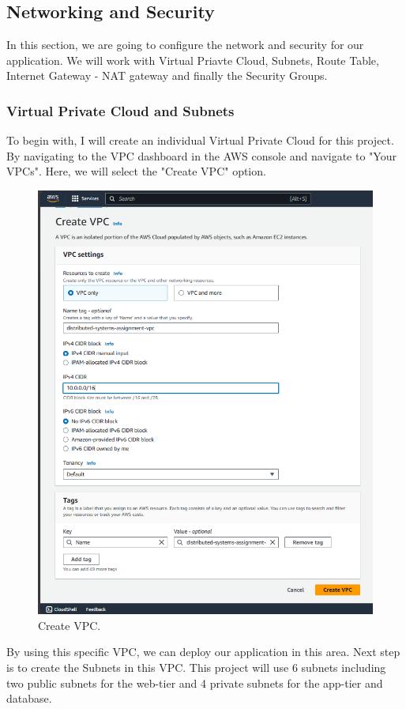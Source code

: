 \documentclass{article}
\begin{document}
\newpage
\subsection{Networking and Security}
In this section, we are going to configure the network and security for our application. We will work with Virtual Priavte Cloud, Subnets, Route Table, Internet Gateway - NAT gateway and finally the Security Groups.\par
\subsubsection{Virtual Private Cloud and Subnets}
To begin with, I will create an individual Virtual Private Cloud for this project. By navigating to the VPC dashboard in the AWS console and navigate to "Your VPCs". Here, we will select the "Create VPC" option.

\begin{figure}[h]
    \centering
    \includegraphics[width=12cm]{Pictures/Networking and Security/VPC_create.png}
    \caption{Create VPC.}
    \label{fig:enter-label}
\end{figure}
By using this specific VPC, we can deploy our application in this area. Next step is to create the Subnets in this VPC. This project will use 6 subnets including two public subnets for the web-tier and 4 private subnets for the app-tier and database.\par
\end{document}
